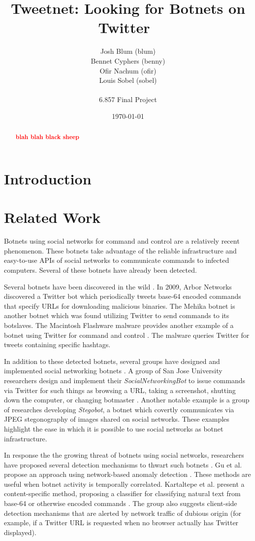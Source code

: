 \documentclass[11pt, oneside]{article} %
\title{ 
Tweetnet: Looking for Botnets on Twitter\
}
\author{
Josh Blum (blum)\\
Bennet Cyphers (benny)\\
Ofir Nachum (ofir)\\
Louis Sobel (sobel)\\
\\
6.857 Final Project
\date{\today}
}
\numberwithin{equation}{section} %
\numberwithin{figure}{section} %
\numberwithin{table}{section} %
\newcommand\todo[1]{\textbf{\textcolor{red}{#1}}}
\begin{document}
\maketitle

\vfill

\begin{abstract}
\todo{blah blah black sheep}
\end{abstract}

\clearpage

\section {Introduction}

\section {Related Work}
Botnets using social networks for command and control are a relatively recent phenomenon.  These botnets take advantage of the reliable infrastructure and easy-to-use APIs of social networks to communicate commands to infected computers.  Several of these botnets have already been detected.  

Several botnets have been discovered in the wild \cite{arbor, trendmicro, flashback}.  In 2009, Arbor Networks \cite{arbor} discovered a Twitter bot which periodically tweets base-64 encoded commands that specify URLs for downloading malicious binaries.  The Mehika botnet \cite{trendmicro} is another botnet which was found utilizing Twitter to send commands to its botslaves.  The Macintosh Flashware malware provides another example of a botnet using Twitter for command and control \cite{flashback}.  The malware queries Twitter for tweets containing specific hashtags.  

In addition to these detected botnets, several groups have designed and implemented social networking botnets \cite{socialnetworking, trojan7, stegobot}.  A group of San Jose University researchers design and implement their \emph{SocialNetworkingBot} to issue commands via Twitter for such things as browsing a URL, taking a screenshot, shutting down the computer, or changing botmaster \cite{socialnetworking}.  Another notable example is a group of researches developing \emph{Stegobot}, a botnet which covertly communicates via JPEG stegonography of images shared on social networks.  These examples highlight the ease in which it is possible to use social networks as botnet infrastructure.

In response the the growing threat of botnets using social networks, researchers have proposed several detection mechanisms to thwart such botnets \cite{botsniffer, kartaltepe, burghouwt}.  Gu et al. propose an approach using network-based anomaly detection \cite{botsniffer}.  These methods are useful when botnet activity is temporally correlated.  Kartaltepe et al. present a content-specific method, proposing a classifier for classifying natural text from base-64 or otherwise encoded commands \cite{kartaltepe}.  The group also suggests client-side detection mechanisms that are alerted by network traffic of dubious origin (for example, if a Twitter URL is requested when no browser actually has Twitter displayed).
\end{document}
